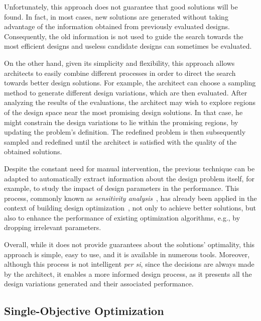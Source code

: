 	Unfortunately, this approach does not guarantee that good solutions will be found. In fact, in most cases, new solutions are generated without taking advantage of the information obtained from previously evaluated designs. Consequently, the old information is not used to guide the search towards the most efficient designs and useless candidate designs can sometimes be evaluated. 
	
	On the other hand, given its simplicity and flexibility, this approach allows architects to easily combine different processes in order to direct the search towards better design solutions. For example, the architect can choose a sampling method to generate different design variations, which are then evaluated. After analyzing the results of the evaluations, the architect may wish to explore regions of the design space near the most promising design solutions. In that case, he might constrain the design variations to lie within the promising regions, by updating the problem’s definition. The redefined problem is then subsequently sampled and redefined until the architect is satisfied with the quality of the obtained solutions.
	
	Despite the constant need for manual intervention, the previous technique can be adapted to automatically extract information about the design problem itself, for example, to study the impact of design parameters in the performance. This process, commonly known as \textit{sensitivity analysis}~\cite{Saltelli2007}, has already been applied in the context of building design optimization~\cite{Tian2013}, not only to achieve better solutions, but also to enhance the performance of existing optimization algorithms, e.g., by dropping irrelevant parameters.
	
	Overall, while it does not provide guarantees about the solutions’ optimality, this approach is simple, easy to use, and it is available in numerous tools. Moreover, although this process is not intelligent \textit{per si}, since the decisions are always made by the architect, it enables a more informed design process, as it presents all the design variations generated and their associated performance.
	
	\subsection{Single-Objective Optimization}
	\label{ssec:soo}
	
